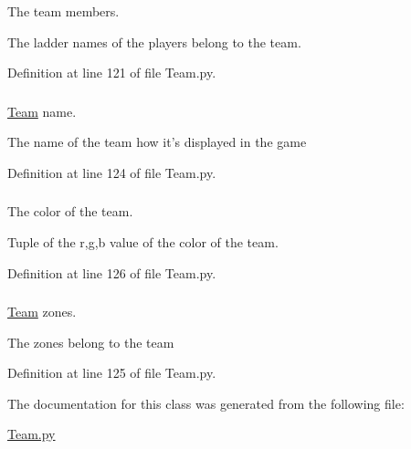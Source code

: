 The team members. 

The ladder names of the players belong to the team. 

Definition at line 121 of file Team.py.

\hypertarget{class_team_1_1_team_aa840b5c614936ab0ceb8c9a041fd63d3}{
\subsubsection[{\_\-\_\-name}]{}}
\label{class_team_1_1_team_aa840b5c614936ab0ceb8c9a041fd63d3}


\hyperlink{class_team_1_1_team}{Team} name. 

The name of the team how it's displayed in the game 

Definition at line 124 of file Team.py.

\hypertarget{class_team_1_1_team_ac98394f815e38111f61f85d60a124459}{
\subsubsection[{color}]{}}
\label{class_team_1_1_team_ac98394f815e38111f61f85d60a124459}


The color of the team. 

Tuple of the r,g,b value of the color of the team. 

Definition at line 126 of file Team.py.

\hypertarget{class_team_1_1_team_a585395bf34a71843cffaf71626138ab4}{
\subsubsection[{zones}]{}}
\label{class_team_1_1_team_a585395bf34a71843cffaf71626138ab4}


\hyperlink{class_team_1_1_team}{Team} zones. 

The zones belong to the team 

Definition at line 125 of file Team.py.



The documentation for this class was generated from the following file:\begin{DoxyCompactItemize}
\item 
\hyperlink{_team_8py}{Team.py}\end{DoxyCompactItemize}
